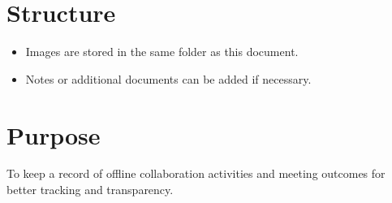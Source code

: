 \documentclass{article}
\begin{document}
\section*{Structure}

\begin{itemize}
    \item Images are stored in the same folder as this document.
    \item Notes or additional documents can be added if necessary.
\end{itemize}

\section*{Purpose}

To keep a record of offline collaboration activities and meeting outcomes for better tracking and transparency.
\end{document}
